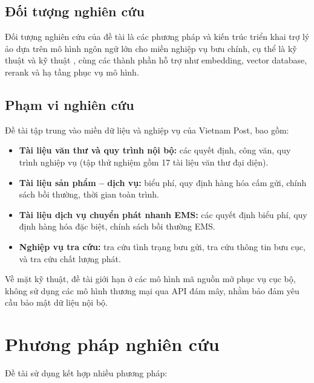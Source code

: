 \subsection{Đối tượng nghiên cứu}

Đối tượng nghiên cứu của đề tài là các phương pháp và kiến trúc triển khai trợ lý ảo dựa
trên mô hình ngôn ngữ lớn cho miền nghiệp vụ bưu chính, cụ thể là kỹ thuật \rag{} và kỹ
thuật \ft, cùng các thành phần hỗ trợ như embedding, vector database, rerank
và hạ tầng phục vụ mô hình.

\subsection{Phạm vi nghiên cứu}

Đề tài tập trung vào miền dữ liệu và nghiệp vụ của Vietnam Post, bao gồm:

\begin{itemize}
  \item \textbf{Tài liệu văn thư và quy trình nội bộ:} các quyết định, công văn, quy trình
  nghiệp vụ (tập thử nghiệm gồm 17 tài liệu văn thư đại diện).
  \item \textbf{Tài liệu sản phẩm -- dịch vụ:} biểu phí, quy định hàng hóa cấm gửi, chính
  sách bồi thường, thời gian toàn trình.
  \item \textbf{Tài liệu dịch vụ chuyển phát nhanh EMS:} các quyết định biểu phí, quy định
  hàng hóa đặc biệt, chính sách bồi thường EMS.
  \item \textbf{Nghiệp vụ tra cứu:} tra cứu tình trạng bưu gửi, tra cứu thông tin bưu cục,
  và tra cứu chất lượng phát.
\end{itemize}

Về mặt kỹ thuật, đề tài giới hạn ở các mô hình mã nguồn mở phục vụ cục bộ, không sử dụng
các mô hình thương mại qua API đám mây, nhằm bảo đảm yêu cầu bảo mật dữ liệu nội bộ.

\section{Phương pháp nghiên cứu}

Đề tài sử dụng kết hợp nhiều phương pháp:

